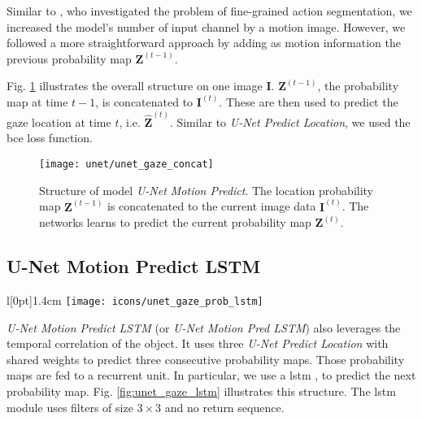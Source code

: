 Similar to \cite{lea16}, who investigated the problem of fine-grained action segmentation, we increased the model's number of input channel by a motion image.
However, we followed a more straightforward approach by adding as motion information the previous probability map $\boldsymbol{Z}^{(t-1)}$.

Fig. \ref{fig:unet_gaze_concat} illustrates the overall structure on one image $\boldsymbol{I}$.
$\boldsymbol{Z}^{(t-1)}$, the probability map at time $t-1$, is concatenated to $\boldsymbol{I}^{(t)}$.
These are then used to predict the gaze location at time $t$, i.e. $\boldsymbol{\hat{Z}}^{(t)}$.
Similar to \textit{U-Net Predict Location}, we used the \gls{bce} loss function.

\begin{figure}[htbp]
  \centering
  \texttt{[image: unet/unet\_gaze\_concat]}
  \caption[U-Net Motion Predict]{Structure of model \textit{U-Net Motion Predict}.
    The location probability map $\boldsymbol{Z}^{(t-1)}$ is concatenated to the current image data $\boldsymbol{I}^{(t)}$.
    The networks learns to predict the current probability map $\boldsymbol{Z}^{(t)}$.}
  \label{fig:unet_gaze_concat}
\end{figure}


\subsection{U-Net Motion Predict LSTM} \label{ch:unet_gaze_prob_lstm}
\begingroup
\setlength\intextsep{0pt}
\begin{wrapfigure}[4]{l}[0pt]{1.4cm}
\texttt{[image: icons/unet\_gaze\_prob\_lstm]}
\end{wrapfigure}

\textit{U-Net Motion Predict LSTM} (or \textit{U-Net Motion Pred LSTM}) also leverages the temporal correlation of the object.
It uses three \textit{U-Net Predict Location} with shared weights to predict three consecutive probability maps.
Those probability maps are fed to a recurrent unit.
In particular, we use a \gls{lstm} \cite{shi15}, to predict the next probability map.
Fig. \ref{fig:unet_gaze_lstm} illustrates this structure.
The \gls{lstm} module uses filters of size $3 \times 3$ and no return sequence.

